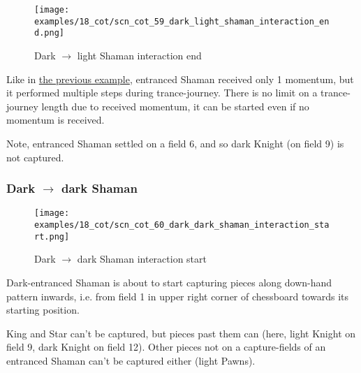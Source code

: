 \clearpage %

\noindent
\begin{figure}[!h]
\texttt{[image: examples/18\_cot/scn\_cot\_59\_dark\_light\_shaman\_interaction\_end.png]}
\caption{Dark $\rightarrow$ light Shaman interaction end}
\label{fig:scn_cot_59_dark_light_shaman_interaction_end}
\end{figure}

Like in
\hyperref[fig:scn_cot_56_light_light_shaman_interaction_start]{the previous example},
entranced Shaman received only 1 momentum, but it performed multiple steps during
trance-journey. There is no limit on a trance-journey length due to received momentum,
it can be started even if no momentum is received.

Note, entranced Shaman settled on a field 6, and so dark Knight (on field 9) is not
captured.

\clearpage %

\subsubsection*{Dark $\rightarrow$ dark Shaman}
\label{sec:Conquest of Tlalocan/Trance-journey/Interactions/Dark --> dark Shaman}

\vspace*{-1.5\baselineskip}
\noindent
\begin{figure}[!h]
\texttt{[image: examples/18\_cot/scn\_cot\_60\_dark\_dark\_shaman\_interaction\_start.png]}
\vspace*{-1.4\baselineskip}
\caption{Dark $\rightarrow$ dark Shaman interaction start}
\label{fig:scn_cot_60_dark_dark_shaman_interaction_start}
\end{figure}

\vspace*{-0.5\baselineskip}
Dark-entranced Shaman is about to start capturing pieces along down-hand pattern
inwards, i.e. from field 1 in upper right corner of chessboard towards its starting
position.

King and Star can't be captured, but pieces past them can (here, light Knight on
field 9, dark Knight on field 12). Other pieces not on a capture-fields of an
entranced Shaman can't be captured either (light Pawns).

